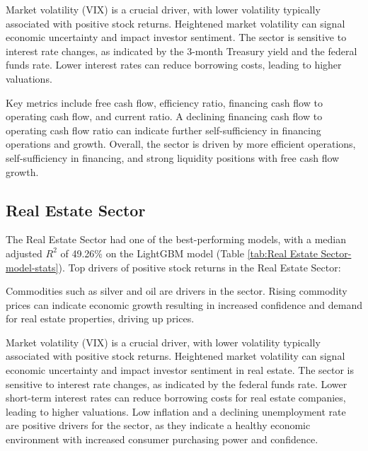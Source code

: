 \documentclass[12pt,a4paper,english]{article}
\begin{document}
Market volatility (VIX) is a crucial driver, with lower volatility typically associated with positive stock returns. Heightened market volatility can signal economic uncertainty and impact investor sentiment. The sector is sensitive to interest rate changes, as indicated by the 3-month Treasury yield and the federal funds rate. Lower interest rates can reduce borrowing costs, leading to higher valuations.

Key metrics include free cash flow, efficiency ratio, financing cash flow to operating cash flow, and current ratio. A declining financing cash flow to operating cash flow ratio can indicate further self-sufficiency in financing operations and growth. Overall, the sector is driven by more efficient operations, self-sufficiency in financing, and strong liquidity positions with free cash flow growth.

\subsection{Real Estate Sector}
\label{sec:real-estate}

The Real Estate Sector had one of the best-performing models, with a median adjusted $R^2$ of 49.26\% on the LightGBM model (Table \ref{tab:Real Estate Sector-model-stats}). Top drivers of positive stock returns in the Real Estate Sector:


Commodities such as silver and oil are drivers in the sector. Rising commodity prices can indicate economic growth resulting in increased confidence and demand for real estate properties, driving up prices.

Market volatility (VIX) is a crucial driver, with lower volatility typically associated with positive stock returns. Heightened market volatility can signal economic uncertainty and impact investor sentiment in real estate. The sector is sensitive to interest rate changes, as indicated by the federal funds rate. Lower short-term interest rates can reduce borrowing costs for real estate companies, leading to higher valuations. Low inflation and a declining unemployment rate are positive drivers for the sector, as they indicate a healthy economic environment with increased consumer purchasing power and confidence.
\end{document}
